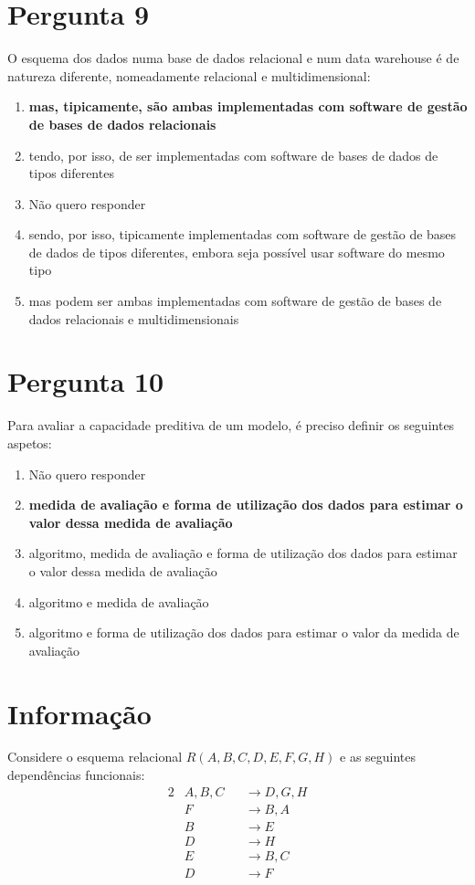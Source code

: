 {\section{Pergunta 9}
O esquema dos dados numa base de dados relacional e num data warehouse é de natureza diferente, nomeadamente relacional e multidimensional:
\begin{enumerate}[label=\alph*.]\itemsep0em
    \item \textbf{mas, tipicamente, são ambas implementadas com software de gestão de bases de dados relacionais \greencheckmark}
    \item tendo, por isso, de ser implementadas com software de bases de dados de tipos diferentes
    \item Não quero responder
    \item sendo, por isso, tipicamente implementadas com software de gestão de bases de dados de tipos diferentes, embora seja possível usar software do mesmo tipo
    \item mas podem ser ambas implementadas com software de gestão de bases de dados relacionais e multidimensionais
\end{enumerate}

\section{Pergunta 10}
Para avaliar a capacidade preditiva de um modelo, é preciso definir os seguintes aspetos:
\begin{enumerate}[label=\alph*.]\itemsep0em
    \item Não quero responder
    \item \textbf{medida de avaliação e forma de utilização dos dados para estimar o valor dessa medida de avaliação \greencheckmark}
    \item algoritmo, medida de avaliação e forma de utilização dos dados para estimar o valor dessa medida de avaliação
    \item algoritmo e medida de avaliação
    \item algoritmo e forma de utilização dos dados para estimar o valor da medida de avaliação
\end{enumerate}

\section*{Informação}
Considere o esquema relacional $R(A,B,C,D,E,F,G,H)$ e as seguintes dependências funcionais:
\begin{alignat*}{2}
    & A, B, C && \rightarrow D, G, H \\
    & F       && \rightarrow B, A    \\
    & B       && \rightarrow E       \\
    & D       && \rightarrow H       \\
    & E       && \rightarrow B, C    \\
    & D       && \rightarrow F
\end{alignat*}

}
